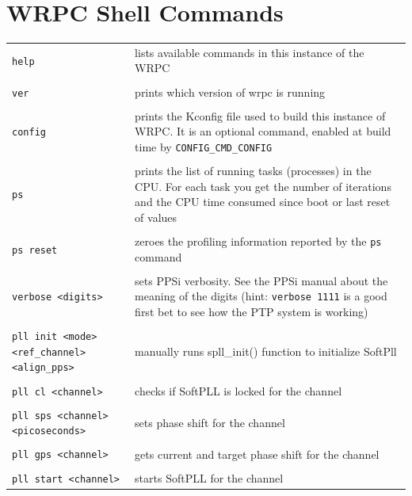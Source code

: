 \documentclass[a4paper, 12pt]{article}
\newcommand{\code}[1]{\texttt{#1}}
\newcommand{\codeHook}[1]{\mbox{\ttfamily\MakeTextUppercase{#1}}}
\begin{document}


\appendix
\clearpage
\label{WRPC Shell commands}
\section{WRPC Shell Commands}

\footnotesize
\begin{longtable}{  p{8cm}  p{6cm} }

  \code{help} & lists available commands in this instance of the \codeHook{wrpc} \\
 & \\
  \code{ver} & prints which version of wrpc is running \\
 & \\
  \code{config} & prints the Kconfig file used to build this instance of
\codeHook{wrpc}. It is an optional command, enabled at build time by
\texttt{CONFIG\_CMD\_CONFIG} \\
 & \\
  \code{ps} & prints the list of running tasks (processes) in the CPU.
For each task you get the number of iterations and the CPU time consumed
since boot or last reset of values\\
 & \\
  \code{ps reset} & zeroes the profiling information reported by
the \code{ps} command\\
 & \\
  \code{verbose <digits>} & sets PPSi verbosity. See the PPSi manual
about the meaning of the digits (hint: \texttt{verbose 1111} is a good first bet to
see how the \codeHook{ptp} system is working) \\
 & \\
  \code{pll init <mode> <ref\_channel> <align\_pps>} & manually runs
spll\_init() function to initialize SoftPll \\
 & \\
  \code{pll cl <channel>} & checks if SoftPLL is locked for the channel\\
 & \\
  \code{pll sps <channel> <picoseconds>} & sets phase shift for the channel\\
 & \\
  \code{pll gps <channel>} & gets current and target phase shift for the channel\\
 & \\
  \code{pll start <channel>} & starts SoftPLL for the channel\\

\end{longtable}
\end{document}
